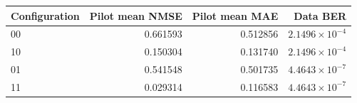 \begin{tabular}{lrrr}
\toprule
Configuration & Pilot mean NMSE & Pilot mean MAE & Data BER \\
\midrule
00 & 0.661593 & 0.512856 & $2.1496\times10^{-4}$ \\
10 & 0.150304 & 0.131740 & $2.1496\times10^{-4}$ \\
01 & 0.541548 & 0.501735 & $4.4643\times10^{-7}$ \\
11 & 0.029314 & 0.116583 & $4.4643\times10^{-7}$ \\
\bottomrule
\end{tabular}
